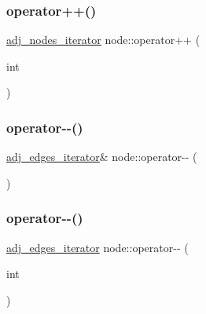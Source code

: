 \subsubsection{\texorpdfstring{operator++()}{operator++()}\hspace{0.1cm}{\footnotesize\ttfamily [6/6]}}
{\footnotesize\ttfamily \mbox{\hyperlink{classnode_a392f19ea6dfa344bdf5c4d5a4b25eb8c}{adj\+\_\+nodes\+\_\+iterator}} node\+::operator++ (\begin{DoxyParamCaption}\item[{int}]{ }\end{DoxyParamCaption})}

\mbox{\label{classnode_a99fdb299b044facd9cb3f90f18a559fd}} 
\subsubsection{\texorpdfstring{operator-\/-\/()}{operator--()}\hspace{0.1cm}{\footnotesize\ttfamily [1/6]}}
{\footnotesize\ttfamily \mbox{\hyperlink{classnode_abdd49248203010f2d5432dfef22d017a}{adj\+\_\+edges\+\_\+iterator}}\& node\+::operator-\/-\/ (\begin{DoxyParamCaption}{ }\end{DoxyParamCaption})}

\mbox{\label{classnode_a1e5751de7ba220836ffee941707c277b}} 
\subsubsection{\texorpdfstring{operator-\/-\/()}{operator--()}\hspace{0.1cm}{\footnotesize\ttfamily [2/6]}}
{\footnotesize\ttfamily \mbox{\hyperlink{classnode_abdd49248203010f2d5432dfef22d017a}{adj\+\_\+edges\+\_\+iterator}} node\+::operator-\/-\/ (\begin{DoxyParamCaption}\item[{int}]{ }\end{DoxyParamCaption})}

\mbox{\label{classnode_a046088eba56244e29945d0197f6b642f}} 

